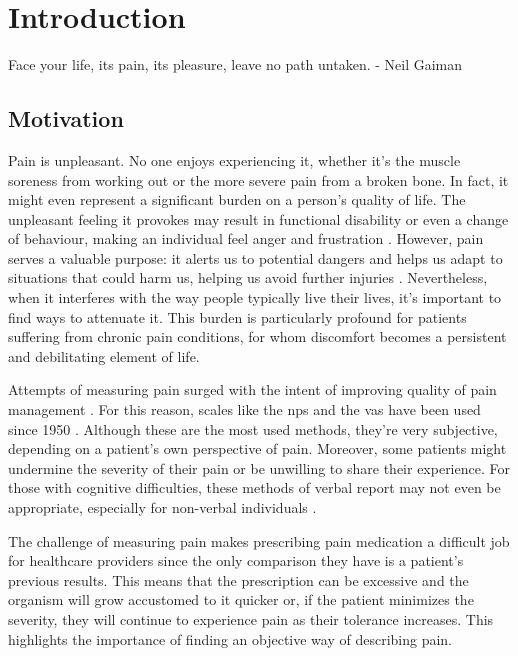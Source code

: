 \chapter{Introduction}%
\label{chapter:introduction}

\begin{introduction}
Face your life, its pain, its pleasure, leave no path untaken. - Neil Gaiman
\end{introduction}


\section{Motivation}
Pain is unpleasant. No one enjoys experiencing it, whether it's the muscle soreness from working out or the more severe pain from a broken bone. In fact, it might even represent a significant burden on a person's quality of life. The unpleasant feeling it provokes may result in functional disability or even a change of behaviour, making an individual feel anger and frustration \cite{Dirk2021}. However, pain serves a valuable purpose: it alerts us to potential dangers and helps us adapt to situations that could harm us, helping us avoid further injuries \cite{Coninx2021}. Nevertheless, when it interferes with the way people typically live their lives, it's important to find ways to attenuate it. This burden is particularly profound for patients suffering from chronic pain conditions, for whom discomfort becomes a persistent and debilitating element of life.

Attempts of measuring pain surged with the intent of improving quality of pain management \cite{Nugent2021}. For this reason, scales like the \ac{nps} and the \ac{vas} have been used since 1950 \cite{Bielewicz2022}. Although these are the most used methods, they're very subjective, depending on a patient's own perspective of pain. Moreover, some patients might undermine the severity of their pain or be unwilling to share their experience. For those with cognitive difficulties, these methods of verbal report may not even be appropriate, especially for non-verbal individuals \cite{Qin2022}.

The challenge of measuring pain makes prescribing pain medication a difficult job for healthcare providers since the only comparison they have is a patient's previous results. This means that the prescription can be excessive and the organism will grow accustomed to it quicker or, if the patient minimizes the severity, they will continue to experience pain as their tolerance increases. This highlights the importance of finding an objective way of describing pain. 

